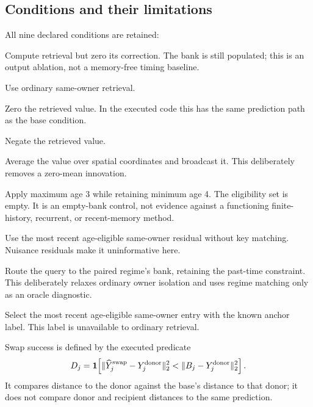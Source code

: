 \documentclass[11pt]{article}
\begin{document}
\subsection{Conditions and their limitations}
All nine declared conditions are retained:
\begin{description}[style=nextline,leftmargin=1.0cm]
\item[Base / no memory] Compute retrieval but zero its correction. The bank is
still populated; this is an output ablation, not a memory-free timing baseline.
\item[Tensor memory] Use ordinary same-owner retrieval.
\item[Erase] Zero the retrieved value. In the executed code this has the same
prediction path as the base condition.
\item[Sign flip] Negate the retrieved value.
\item[Spatial mean] Average the value over spatial coordinates and broadcast
it. This deliberately removes a zero-mean innovation.
\item[Recent restriction] Apply maximum age 3 while retaining minimum age 4.
The eligibility set is empty. It is an empty-bank control, not evidence against
a functioning finite-history, recurrent, or recent-memory method.
\item[Last residual] Use the most recent age-eligible same-owner residual
without key matching. Nuisance residuals make it uninformative here.
\item[Paired swap] Route the query to the paired regime's bank, retaining the
past-time constraint. This deliberately relaxes ordinary owner isolation and
uses regime matching only as an oracle diagnostic.
\item[Oracle anchor] Select the most recent age-eligible same-owner entry with
the known anchor label. This label is unavailable to ordinary retrieval.
\end{description}
Swap success is defined by the executed predicate
\begin{equation}
 D_j=\mathbf1\!\left[\|\widehat Y_j^{\rm swap}-Y_j^{\rm donor}\|_2^2
       <\|B_j-Y_j^{\rm donor}\|_2^2\right].
\end{equation}
It compares distance to the donor against the base's distance to that donor;
it does not compare donor and recipient distances to the same prediction.
\end{document}
